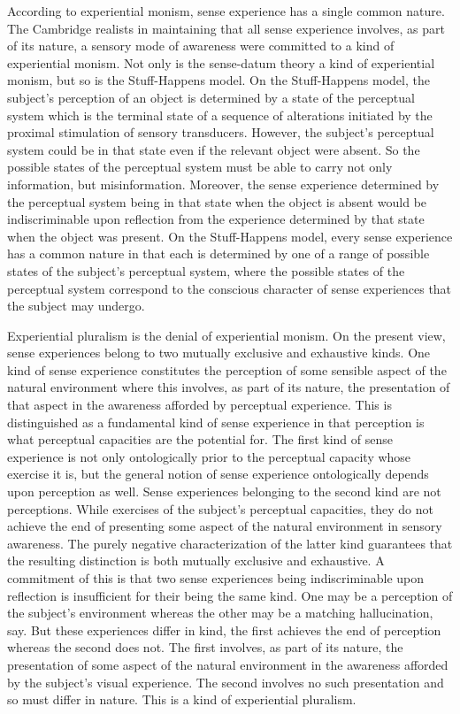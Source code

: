 \documentclass[12pt]{article}
\begin{document}
According to experiential monism, sense experience has a single common nature. The Cambridge realists in maintaining that all sense experience involves, as part of its nature, a sensory mode of awareness were committed to a kind of experiential monism. Not only is the sense-datum theory a kind of experiential monism, but so is the Stuff-Happens model. On the Stuff-Happens model, the subject's perception of an object is determined by a state of the perceptual system which is the terminal state of a sequence of alterations initiated by the proximal stimulation of sensory transducers. However, the subject's perceptual system could be in that state even if the relevant object were absent. So the possible states of the perceptual system must be able to carry not only information, but misinformation. Moreover, the sense experience determined by the perceptual system being in that state when the object is absent would be indiscriminable upon reflection from the experience determined by that state when the object was present. On the Stuff-Happens model, every sense experience has a common nature in that each is determined by one of a range of possible states of the subject's perceptual system, where the possible states of the perceptual system correspond to the conscious character of sense experiences that the subject may undergo.

Experiential pluralism is the denial of experiential monism. On the present view, sense experiences belong to two mutually exclusive and exhaustive kinds. One kind of sense experience constitutes the perception of some sensible aspect of the natural environment where this involves, as part of its nature, the presentation of that aspect in the awareness afforded by perceptual experience. This is distinguished as a fundamental kind of sense experience in that perception is what perceptual capacities are the potential for. The first kind of sense experience is not only ontologically prior to the perceptual capacity whose exercise it is, but the general notion of sense experience ontologically depends upon perception as well. Sense experiences belonging to the second kind are not perceptions. While exercises of the subject's perceptual capacities, they do not achieve the end of presenting some aspect of the natural environment in sensory awareness. The purely negative characterization of the latter kind guarantees that the resulting distinction is both mutually exclusive and exhaustive. A commitment of this is that two sense experiences being indiscriminable upon reflection is insufficient for their being the same kind. One may be a perception of the subject's environment whereas the other may be a matching hallucination, say. But these experiences differ in kind, the first achieves the end of perception whereas the second does not. The first involves, as part of its nature, the presentation of some aspect of the natural environment in the awareness afforded by the subject's visual experience. The second involves no such presentation and so must differ in nature. This is a kind of experiential pluralism. 
\end{document}
